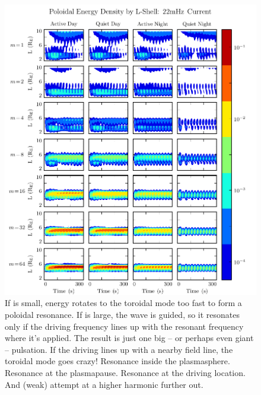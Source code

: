 
\begin{figure}[H]
    \centering
    \includegraphics[width=\textwidth]{figures/ucolor_pol_022mHz.pdf}
    \caption[Poloidal and Toroidal Energy Distribution: Resonant Driving]{
      If \azm is small, energy rotates to the toroidal mode too fast to form a poloidal resonance. If \azm is large, the \Alfven wave is guided, so it resonates only if the driving frequency lines up with the resonant frequency where it's applied. The result is just one big -- or perhaps even giant -- pulsation. If the driving lines up with a nearby field line, the toroidal mode goes crazy! Resonance inside the plasmasphere. Resonance at the plasmapause. Resonance at the driving location. And (weak) attempt at a higher harmonic further out. 
    }
    \label{fig_resonant_driving}
\end{figure}

